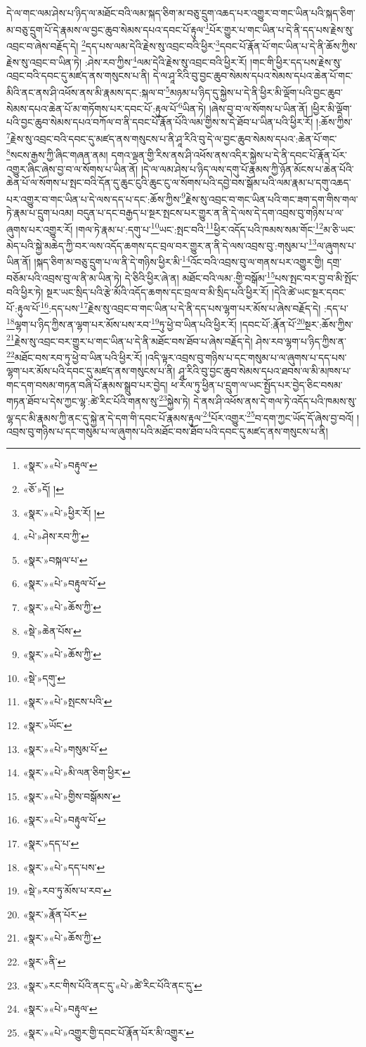 དེ་ལ་གང་ལམ་ཤེས་པ་ཉིད་ལ་མཐོང་བའི་ལམ་སྐད་ཅིག་མ་བཅུ་དྲུག་འཆད་པར་འགྱུར་བ་གང་ཡིན་པའི་སྐད་ཅིག་མ་བཅུ་དྲུག་པོ་དེ་རྣམས་ལ་བྱང་ཆུབ་སེམས་དཔའ་དབང་པོ་རྟུལ་\footnote{«སྣར་»«པེ་»བརྟུལ་}པོར་གྱུར་པ་གང་ཡིན་པ་དེ་ནི་དད་པས་རྗེས་སུ་འབྲང་བ་ཞེས་བརྗོད་དེ། \footnote{«ཅོ་»དོ། ། }དད་པས་ལམ་དེའི་རྗེས་སུ་འབྲང་བའི་ཕྱིར་\footnote{«སྣར་»«པེ་»ཕྱིར་རོ། །}དབང་པོ་རྣོན་པོ་གང་ཡིན་པ་དེ་ནི་ཆོས་ཀྱིས་རྗེས་སུ་འབྲང་བ་ཡིན་ཏེ། :ཤེས་རབ་ཀྱིས་\footnote{«པེ་»ཤེས་རབ་ཀྱི་}ལམ་དེའི་རྗེས་སུ་འབྲང་བའི་ཕྱིར་རོ། །གང་གི་ཕྱིར་དད་པས་རྗེས་སུ་འབྲང་བའི་དབང་དུ་མཛད་ནས་གསུངས་པ་ནི། དེ་ལ་ཤཱ་རིའི་བུ་བྱང་ཆུབ་སེམས་དཔའ་སེམས་དཔའ་ཆེན་པོ་གང་མིའི་ནང་ནས་ཤི་འཕོས་ནས་མི་རྣམས་དང་:སྐལ་བ་\footnote{«སྣར་»བསྐལ་པ་}མཉམ་པ་ཉིད་དུ་སྐྱེས་པ་དེ་ནི་ཕྱིར་མི་ལྡོག་པའི་བྱང་ཆུབ་སེམས་དཔའ་ཆེན་པོ་མ་གཏོགས་པར་དབང་པོ་:རྟུལ་པོ་\footnote{«སྣར་»«པེ་»བརྟུལ་པོ་}ཡིན་ཏེ། །ཞེས་བྱ་བ་ལ་སོགས་པ་ཡིན་ནོ། །ཕྱིར་མི་ལྡོག་པའི་བྱང་ཆུབ་སེམས་དཔའ་བཀོལ་བ་ནི་དབང་པོ་རྣོན་པོའི་ལམ་གྱིས་ས་དེ་ཐོབ་པ་ཡིན་པའི་ཕྱིར་རོ། །:ཆོས་ཀྱིས་\footnote{«སྣར་»«པེ་»ཆོས་ཀྱི་}རྗེས་སུ་འབྲང་བའི་དབང་དུ་མཛད་ནས་གསུངས་པ་ནི་ཤཱ་རིའི་བུ་དེ་ལ་བྱང་ཆུབ་སེམས་དཔའ་:ཆེན་པོ་གང་\footnote{«སྡེ་»ཆེན་པོས་}སངས་རྒྱས་ཀྱི་ཞིང་གཞན་ནམ། དགའ་ལྡན་གྱི་རིས་ནས་ཤི་འཕོས་ནས་འདིར་སྐྱེས་པ་དེ་ནི་དབང་པོ་རྣོན་པོར་འགྱུར་ཞིང་ཞེས་བྱ་བ་ལ་སོགས་པ་ཡིན་ནོ། །དེ་ལ་ལམ་ཤེས་པ་ཉིད་ལས་དགུ་པོ་རྣམས་ཀྱི་ཉོན་མོངས་པ་ཆེན་པོའི་ཆེན་པོ་ལ་སོགས་པ་སྤང་བའི་དོན་དུ་ཆུང་ངུའི་ཆུང་ངུ་ལ་སོགས་པའི་དབྱེ་བས་སྒོམ་པའི་ལམ་རྣམ་པ་དགུ་འཆད་པར་འགྱུར་བ་གང་ཡིན་པ་དེ་ལས་དད་པ་དང་:ཆོས་ཀྱིས་\footnote{«སྣར་»«པེ་»ཆོས་ཀྱི་}རྗེས་སུ་འབྲང་བ་གང་ཡིན་པའི་གང་ཟག་དག་གིས་གལ་ཏེ་རྣམ་པ་དྲུག་པའམ། བདུན་པ་དང་བརྒྱད་པ་སྔར་སྤངས་པར་གྱུར་ན་ནི་དེ་ལས་དེ་དག་འབྲས་བུ་གཉིས་པ་ལ་ཞུགས་པར་འགྱུར་རོ། །གལ་ཏེ་རྣམ་པ་:དགུ་པ་\footnote{«སྡེ་»དགུ་}ཡང་:སྤང་བའི་\footnote{«སྣར་»«པེ་»སྤངས་པའི་}ཕྱིར་འདོད་པའི་ཁམས་སམ་གོང་\footnote{«སྣར་»ཡོང་}མ་ཅི་ཡང་མེད་པའི་སྐྱེ་མཆེད་ཀྱི་བར་ལས་འདོད་ཆགས་དང་བྲལ་བར་གྱུར་ན་ནི་དེ་ལས་འབྲས་བུ་:གསུམ་པ་\footnote{«སྣར་»«པེ་»གསུམ་པོ་}ལ་ཞུགས་པ་ཡིན་ནོ། །སྐད་ཅིག་མ་བཅུ་དྲུག་པ་ལ་ནི་དེ་གཉིས་ཕྱིར་མི་\footnote{«སྣར་»«པེ་»མི་ལན་ཅིག་ཕྱིར་}འོང་བའི་འབྲས་བུ་ལ་གནས་པར་འགྱུར་གྱི། དགྲ་བཅོམ་པའི་འབྲས་བུ་ལ་ནི་མ་ཡིན་ཏེ། དེ་ཅིའི་ཕྱིར་ཞེ་ན། མཐོང་བའི་ལམ་:གྱི་བསྒོམ་\footnote{«སྣར་»«པེ་»གྱིས་བསྒོམས་}པས་སྤང་བར་བྱ་བ་མི་སྤོང་བའི་ཕྱིར་ཏེ། སྔར་ཡང་སྲིད་པའི་རྩེ་མོའི་འདོད་ཆགས་དང་བྲལ་བ་མི་སྲིད་པའི་ཕྱིར་རོ། །དེའི་ཚེ་ཡང་སྔར་དབང་པོ་:རྟུལ་པོ་\footnote{«སྣར་»«པེ་»བརྟུལ་པོ་}:དད་པས་\footnote{«སྣར་»དད་པ་}རྗེས་སུ་འབྲང་བ་གང་ཡིན་པ་དེ་ནི་དད་པས་ལྷག་པར་མོས་པ་ཞེས་བརྗོད་དེ། :དད་པ་\footnote{«སྣར་»«པེ་»དད་པས་}ལྷག་པ་ཉིད་ཀྱིས་ན་ལྷག་པར་མོས་པས་རབ་\footnote{«སྡེ་»རབ་ཏུ་མོས་པ་རབ་}ཏུ་ཕྱེ་བ་ཡིན་པའི་ཕྱིར་རོ། །དབང་པོ་:རྣོན་པོ་\footnote{«སྣར་»རྣོན་པོར་}སྔར་:ཆོས་ཀྱིས་\footnote{«སྣར་»«པེ་»ཆོས་ཀྱི་}རྗེས་སུ་འབྲང་བར་གྱུར་པ་གང་ཡིན་པ་དེ་ནི་མཐོང་བས་ཐོབ་པ་ཞེས་བརྗོད་དེ། ཤེས་རབ་ལྷག་པ་ཉིད་ཀྱིས་ན་\footnote{«སྣར་»ནི་}མཐོང་བས་རབ་ཏུ་ཕྱེ་བ་ཡིན་པའི་ཕྱིར་རོ། །འདི་ལྟར་འབྲས་བུ་གཉིས་པ་དང་གསུམ་པ་ལ་ཞུགས་པ་དད་པས་ལྷག་པར་མོས་པའི་དབང་དུ་མཛད་ནས་གསུངས་པ་ནི། ཤཱ་རིའི་བུ་བྱང་ཆུབ་སེམས་དཔའ་ཐབས་ལ་མི་མཁས་པ་གང་དག་བསམ་གཏན་བཞི་པོ་རྣམས་སྒྲུབ་པར་བྱེད། ཕ་རོལ་ཏུ་ཕྱིན་པ་དྲུག་ལ་ཡང་སྤྱོད་པར་བྱེད་ཅིང་བསམ་གཏན་ཐོབ་པ་དེས་ཀྱང་ལྷ་:ཚེ་རིང་པོའི་གནས་སུ་\footnote{«སྣར་»རང་གིས་པོའི་ནང་དུ་«པེ་»ཚེ་རིང་པོའི་ནང་དུ་}སྐྱེས་ཏེ། དེ་ནས་ཤི་འཕོས་ནས་དེ་གལ་ཏེ་འདོད་པའི་ཁམས་སུ་ལྷ་དང་མི་རྣམས་ཀྱི་ནང་དུ་སྐྱེ་ན་དེ་དག་གི་དབང་པོ་རྣམས་རྟུལ་\footnote{«སྣར་»«པེ་»བརྟུལ་}པོར་འགྱུར་\footnote{«སྣར་»«པེ་»འགྱུར་གྱི་དབང་པོ་རྣོན་པོར་མི་འགྱུར་}བ་དག་ཀྱང་ཡོད་དོ་ཞེས་བྱ་བའོ། །འབྲས་བུ་གཉིས་པ་དང་གསུམ་པ་ལ་ཞུགས་པའི་མཐོང་བས་ཐོབ་པའི་དབང་དུ་མཛད་ནས་གསུངས་པ་ནི། 
